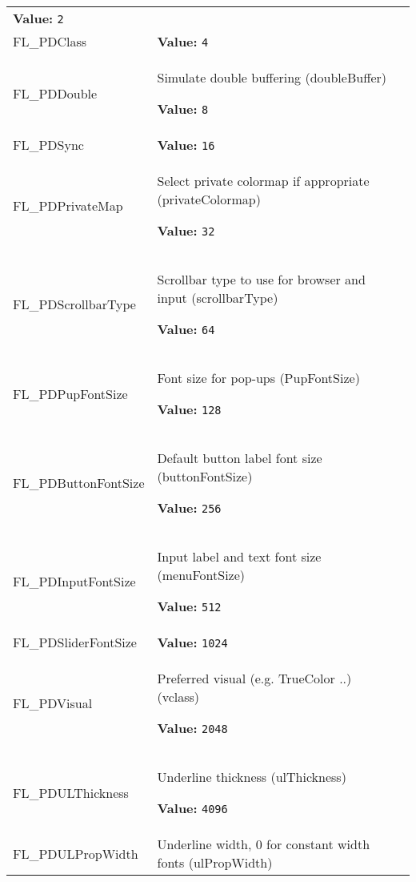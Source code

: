 \begin{longtable}{|p{\varnamewidth}|p{\vardescrwidth}|l}
\textbf{Value:} 
{\tt 2}&\\
\cline{1-2}
\raggedright F\-L\-\_\-P\-D\-C\-l\-a\-s\-s\- & \raggedright \textbf{Value:} 
{\tt 4}&\\
\cline{1-2}
\raggedright F\-L\-\_\-P\-D\-D\-o\-u\-b\-l\-e\- & \raggedright Simulate double buffering (doubleBuffer)

\textbf{Value:} 
{\tt 8}&\\
\cline{1-2}
\raggedright F\-L\-\_\-P\-D\-S\-y\-n\-c\- & \raggedright \textbf{Value:} 
{\tt 16}&\\
\cline{1-2}
\raggedright F\-L\-\_\-P\-D\-P\-r\-i\-v\-a\-t\-e\-M\-a\-p\- & \raggedright Select private colormap if appropriate (privateColormap)

\textbf{Value:} 
{\tt 32}&\\
\cline{1-2}
\raggedright F\-L\-\_\-P\-D\-S\-c\-r\-o\-l\-l\-b\-a\-r\-T\-y\-p\-e\- & \raggedright Scrollbar type to use for browser and input (scrollbarType)

\textbf{Value:} 
{\tt 64}&\\
\cline{1-2}
\raggedright F\-L\-\_\-P\-D\-P\-u\-p\-F\-o\-n\-t\-S\-i\-z\-e\- & \raggedright Font size for pop-ups (PupFontSize)

\textbf{Value:} 
{\tt 128}&\\
\cline{1-2}
\raggedright F\-L\-\_\-P\-D\-B\-u\-t\-t\-o\-n\-F\-o\-n\-t\-S\-i\-z\-e\- & \raggedright Default button label font size (buttonFontSize)

\textbf{Value:} 
{\tt 256}&\\
\cline{1-2}
\raggedright F\-L\-\_\-P\-D\-I\-n\-p\-u\-t\-F\-o\-n\-t\-S\-i\-z\-e\- & \raggedright Input label and text font size (menuFontSize)

\textbf{Value:} 
{\tt 512}&\\
\cline{1-2}
\raggedright F\-L\-\_\-P\-D\-S\-l\-i\-d\-e\-r\-F\-o\-n\-t\-S\-i\-z\-e\- & \raggedright \textbf{Value:} 
{\tt 1024}&\\
\cline{1-2}
\raggedright F\-L\-\_\-P\-D\-V\-i\-s\-u\-a\-l\- & \raggedright Preferred visual (e.g. TrueColor ..) (vclass)

\textbf{Value:} 
{\tt 2048}&\\
\cline{1-2}
\raggedright F\-L\-\_\-P\-D\-U\-L\-T\-h\-i\-c\-k\-n\-e\-s\-s\- & \raggedright Underline thickness (ulThickness)

\textbf{Value:} 
{\tt 4096}&\\
\cline{1-2}
\raggedright F\-L\-\_\-P\-D\-U\-L\-P\-r\-o\-p\-W\-i\-d\-t\-h\- & \raggedright Underline width, 0 for constant width fonts (ulPropWidth)


\end{longtable}
